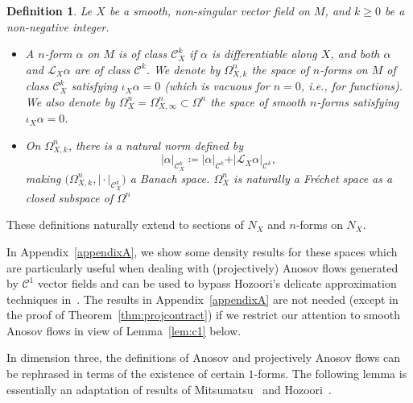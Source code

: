\documentclass[letterpaper, 11pt]{article}
\numberwithin{equation}{section}
\newtheorem{defn}[thm]{Definition}
\begin{document}
\begin{defn} \label{def:reg}
Le $X$ be a smooth, non-singular vector field on $M$, and $k \geq 0$ be a non-negative integer.
\begin{itemize}
    \item A $n$-form $\alpha$ on $M$ is of class $\mathcal{C}^k_X$ if $\alpha$ is differentiable along $X$, and both $\alpha$ and $\mathcal{L}_X \alpha$ are of class $\mathcal{C}^k$. We denote by $\Omega^n_{X,k}$ the space of $n$-forms on $M$ of class $\mathcal{C}^k_X$ satisfying $\iota_X \alpha = 0$ (which is vacuous for $n=0$, i.e., for functions). We also denote by $\Omega^n_{X} = \Omega^n_{X, \infty} \subset \Omega^n$ the space of smooth $n$-forms satisfying $\iota_X \alpha = 0$.
    \item On $\Omega^n_{X,k}$, there is a natural norm defined by $$\vert \alpha \vert_{\mathcal{C}_X^k} \coloneqq \vert \alpha \vert_{\mathcal{C}^k} + \vert \mathcal{L}_X \alpha \vert_{\mathcal{C}^k},$$ making $\big(\Omega_{X,k}^n, \vert \cdot \vert_{\mathcal{C}_X^k}\big)$ a Banach space. $\Omega^n_{X}$ is naturally a Fr\'echet space as a closed subspace of $\Omega^n$
\end{itemize}
\end{defn}
These definitions naturally extend to sections of $N_X$ and $n$-forms on $N_X$.

In Appendix~\ref{appendixA}, we show some density results for these spaces which are particularly useful when dealing with (projectively) Anosov flows generated by $\mathcal{C}^1$ vector fields and can be used to bypass Hozoori's delicate approximation techniques in~\cite[Section 4]{H22a}. The results in Appendix~\ref{appendixA} are not needed (except in the proof of Theorem~\ref{thm:projcontract}) if we restrict our attention to smooth Anosov flows in view of Lemma~\ref{lem:c1} below.

\medskip

In dimension three, the definitions of Anosov and projectively Anosov flows can be rephrased in terms of the existence of certain $1$-forms. The following lemma is essentially an adaptation of results of Mitsumatsu~\cite{M95} and Hozoori~\cite{H22a, H22b}.
\end{document}
